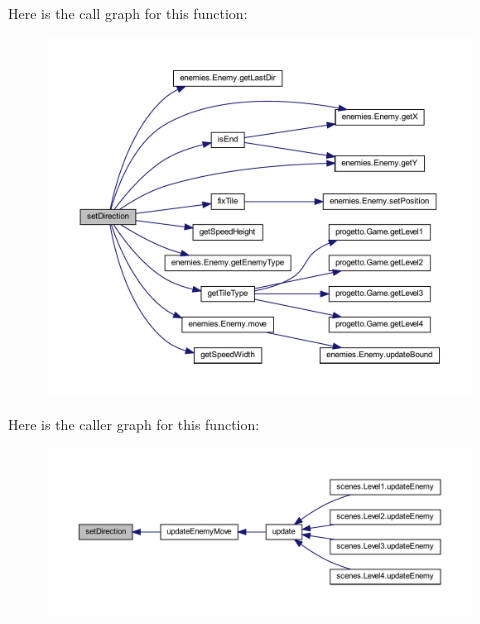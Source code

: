 Here is the call graph for this function\+:\nopagebreak
\begin{figure}[H]
\begin{center}
\leavevmode
\includegraphics[width=350pt]{classmanagers_1_1_enemy_manager_a839e4729819875981f138997b2d3f438_cgraph}
\end{center}
\end{figure}
Here is the caller graph for this function\+:\nopagebreak
\begin{figure}[H]
\begin{center}
\leavevmode
\includegraphics[width=350pt]{classmanagers_1_1_enemy_manager_a839e4729819875981f138997b2d3f438_icgraph}
\end{center}
\end{figure}
\mbox{\label{classmanagers_1_1_enemy_manager_aa38fcad82cf2cd5ac5531d8c2004fdda}} 
